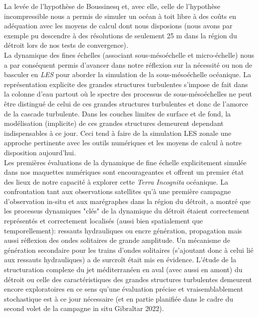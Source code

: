 La levée de l'hypothèse de Boussinesq et, avec elle, celle de l'hypothèse incompressible nous a permis de simuler un océan à toit libre à des coûts en adéquation avec les moyens de calcul dont nous disposions (nous avons par exemple pu descendre à des résolutions de seulement 25 m dans la région du détroit lors de nos tests de convergence).\\
La dynamique des fines échelles (associant sous-mésoéchelle et micro-échelle) nous a par conséquent permis d'avancer dans notre réflexion sur la nécessité ou non de basculer en \textit{LES} pour aborder la simulation de la sous-mésoéchelle océanique. La représentation explicite des grandes structures turbulentes s'impose de fait dans la colonne d'eau partout où le spectre des processus de sous-mésoéchelles ne peut être distingué de celui de ces grandes structures turbulentes et donc de l'amorce de la cascade turbulente. Dans les couches limites de surface et de fond, la modélisation (implicite) de ces grandes structures demeurent dependant indispensables à ce jour. Ceci tend à faire de la simulation LES zonale une approche pertinente avec les outils numériques et les moyens de calcul à notre disposition aujourd'hui.\\
Les premières évaluations de la dynamique de fine échelle explicitement simulée dans nos maquettes numériques sont encourageantes et offrent un premier état des lieux de notre capacité à explorer cette \textit{Terra Incognita} océanique. La confrontation tant aux observations satellites qu'à une première campagne d'observation in-situ et aux marégraphes dans la région du détroit, a montré que les processus dynamiques "clés" de la dynamique du détroit étaient correctement représentés et correctement localisés (aussi bien spatialement que temporellement): ressauts hydrauliques ou encre génération, propagation mais aussi réflexion des ondes solitaires de grande amplitude. Un mécanisme de génération secondaire pour les trains d'ondes solitaires (s'ajoutant donc à celui lié aux ressauts hydrauliques) a de surcroît était mis en évidence. L'étude de la structuration complexe du jet méditerranéen en aval (avec aussi en amont) du détroit ou celle des caractéristiques des grandes structures turbulentes demeurent encore exploratoires en ce sens qu'une évaluation précise et vraisemblablement stochastique est à ce jour nécessaire (et en partie planifiée dans le cadre du second volet de la campagne in situ Gibraltar 2022).\\

